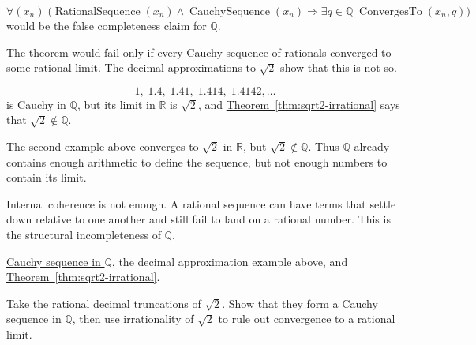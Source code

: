 \begin{remark*}
\[
\forall (x_n)\;
\bigl(
\operatorname{RationalSequence}(x_n)\land \operatorname{CauchySequence}(x_n)
\Longrightarrow
\exists q\in\mathbb{Q}\;\operatorname{ConvergesTo}(x_n,q)
\bigr)
\]
would be the false completeness claim for $\mathbb{Q}$.
\end{remark*}

\begin{remark*}
The theorem would fail only if every Cauchy sequence of rationals converged to
some rational limit. The decimal approximations to $\sqrt{2}$ show that this is
not so.
\end{remark*}

\begin{remark*}
\[
1,\;1.4,\;1.41,\;1.414,\;1.4142,\dots
\]
is Cauchy in $\mathbb{Q}$, but its limit in $\mathbb{R}$ is $\sqrt{2}$, and
\hyperref[thm:sqrt2-irrational]{Theorem~\ref*{thm:sqrt2-irrational}} says that
$\sqrt{2}\notin\mathbb{Q}$.
\end{remark*}

\begin{remark}
The second example above converges to $\sqrt{2}$ in $\mathbb{R}$, but $\sqrt{2}\notin\mathbb{Q}$.  Thus
$\mathbb{Q}$ already contains enough arithmetic to define the sequence, but not enough numbers to
contain its limit.
\end{remark}

\begin{remark*}[Interpretation]
Internal coherence is not enough. A rational sequence can have terms that
settle down relative to one another and still fail to land on a rational
number. This is the structural incompleteness of $\mathbb{Q}$.
\end{remark*}

\begin{remark*}[Dependencies]
\hyperref[def:cauchy-rational]{Cauchy sequence in $\mathbb{Q}$},
the decimal approximation example above, and
\hyperref[thm:sqrt2-irrational]{Theorem~\ref*{thm:sqrt2-irrational}}.
\end{remark*}

\begin{remark*}
Take the rational decimal truncations of $\sqrt{2}$. Show that they form a
Cauchy sequence in $\mathbb{Q}$, then use irrationality of $\sqrt{2}$ to rule
out convergence to a rational limit.
\end{remark*}


